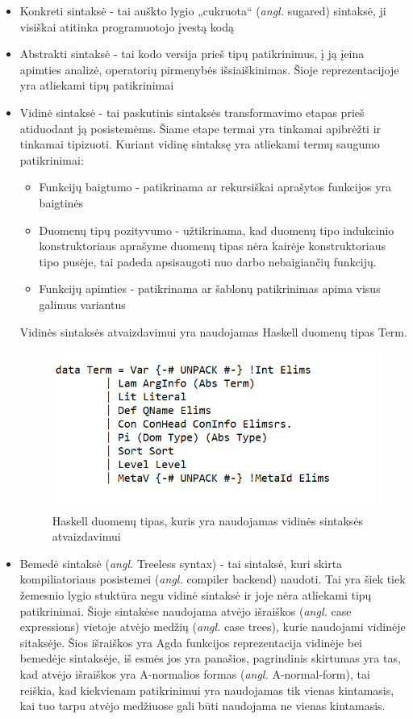 \documentclass{VUMIFPSkursinis}
\begin{document}
\begin{itemize}
	\item Konkreti sintaksė - tai auškto lygio „cukruota“ (\textit{angl.} sugared) sintaksė, ji visiškai atitinka programuotojo įvestą kodą
	\item Abstrakti sintaksė - tai kodo versija prieš tipų patikrinimus, į ją įeina apimties analizė, operatorių pirmenybės išsiaiškinimas. Šioje reprezentacijoje yra atliekami tipų patikrinimai
	\item Vidinė sintaksė - tai paskutinis sintaksės transformavimo etapas prieš atiduodant ją posistemėms. Šiame etape termai yra tinkamai apibrėžti ir tinkamai tipizuoti. Kuriant vidinę sintaksę yra atliekami termų saugumo patikrinimai:
	\begin{itemize}
		\item Funkcijų baigtumo - patikrinama ar rekursiškai aprašytos funkcijos yra baigtinės 
		\item Duomenų tipų pozityvumo - užtikrinama, kad duomenų tipo indukcinio konstruktoriaus aprašyme duomenų tipas nėra kairėje konstruktoriaus tipo pusėje, tai padeda apsisaugoti nuo darbo nebaigiančių funkcijų.
		\item Funkcijų apimties - patikrinama ar šablonų patikrinimas apima visus galimus variantus
	\end{itemize}
	Vidinės sintaksės atvaizdavimui yra naudojamas Haskell duomenų tipas Term.
	\begin{figure}[H]
		\centering
		\includegraphics{HaskellTerm.png}
		\caption{Haskell duomenų tipas, kuris yra naudojamas vidinės sintaksės atvaizdavimui}
		\centering
		\end{figure}
		\item Bemedė sintaksė (\textit{angl.} Treeless syntax) - tai sintaksė, kuri skirta kompiliatoriaus posistemei (\textit{angl.} compiler backend) naudoti. Tai yra šiek tiek žemesnio lygio stuktūra negu vidinė sintaksė ir joje nėra atliekami tipų patikrinimai. Šioje sintakėse naudojama atvėjo išraiškos (\textit{angl.} case expressions) vietoje atvėjo medžių (\textit{angl.} case trees), kurie naudojami vidinėje sitaksėje. Šios išraiškos yra Agda funkcijos reprezentacija vidinėje bei bemedėje sintaksėje, iš esmės jos yra panašios, pagrindinis skirtumas yra tas, kad atvėjo išraiškos yra A-normalios formas (\textit{angl.} A-normal-form), tai reiškia, kad kiekvienam patikrinimui yra naudojamas tik vienas kintamasis, kai tuo tarpu atvėjo medžiuose gali būti naudojama ne vienas kintamasis.
\end{itemize}
\end{document}
